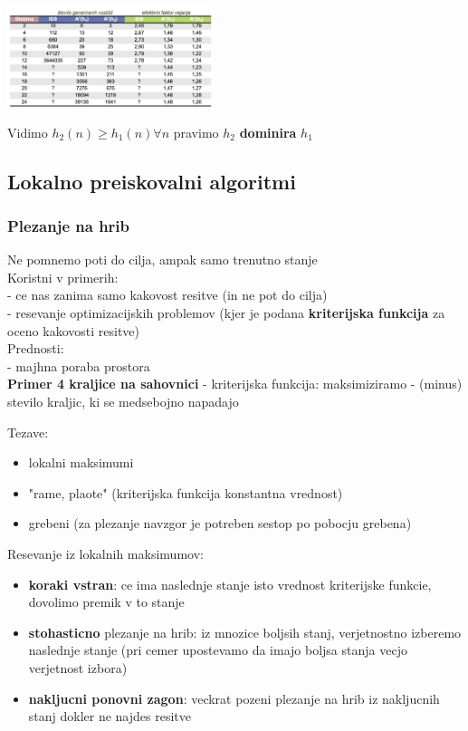 \includegraphics[width=6cm]{./images/kakovost-h(n).png}

Vidimo $h_2(n) \geq h_1(n) \forall n$ pravimo $h_2$ \textbf{dominira} $h_1$\\


\subsection{Lokalno preiskovalni algoritmi}

\subsubsection{Plezanje na hrib}
Ne pomnemo poti do cilja, ampak samo trenutno stanje\\
Koristni v primerih:\\
- ce nas zanima samo kakovost resitve (in ne pot do cilja)\\
- resevanje optimizacijskih problemov (kjer je podana \textbf{kriterijska funkcija} za oceno kakovosti resitve)\\

Prednosti:\\
- majhna poraba prostora\\

\textbf{Primer 4 kraljice na sahovnici}
- kriterijska funkcija: maksimiziramo - (minus) stevilo kraljic, ki se medsebojno napadajo

Tezave:
\begin{itemize}[noitemsep,topsep=0pt,leftmargin=*]
    \item lokalni maksimumi
    \item "rame, plaote" (kriterijska funkcija konstantna vrednost)
    \item grebeni (za plezanje navzgor je potreben sestop po pobocju grebena)
\end{itemize}

Resevanje iz lokalnih maksimumov:
\begin{itemize}[noitemsep,topsep=0pt,leftmargin=*]
    \item \textbf{koraki vstran}: ce ima naslednje stanje isto vrednost kriterijske funkcie, dovolimo premik v to stanje
    \item \textbf{stohasticno} plezanje na hrib: iz mnozice boljsih stanj, verjetnostno izberemo naslednje stanje (pri cemer upostevamo da imajo boljsa stanja vecjo verjetnost izbora)
    \item \textbf{nakljucni ponovni zagon}: veckrat pozeni plezanje na hrib iz nakljucnih stanj dokler ne najdes resitve
\end{itemize}

